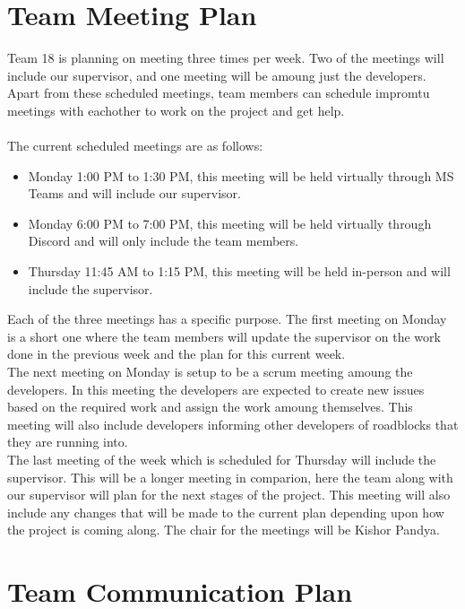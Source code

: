 \documentclass{article}
\begin{document}
\section{Team Meeting Plan}

Team 18 is planning on meeting three times per week. 
Two of the meetings will include our supervisor, and one meeting will be amoung just the developers. 
Apart from these scheduled meetings, team members can schedule impromtu meetings with eachother to work on the project and get help.\\ \\
The current scheduled meetings are as follows:
\begin{itemize}
  \item Monday 1:00 PM to 1:30 PM, this meeting will be held virtually through MS Teams and will include our supervisor.
  \item Monday 6:00 PM to 7:00 PM, this meeting will be held virtually through Discord and will only include the team members.
  \item Thursday 11:45 AM to 1:15 PM, this meeting will be held in-person and will include the supervisor.
\end{itemize}

Each of the three meetings has a specific purpose. The first meeting on Monday is a short one where the team members will update the supervisor on the work done in the previous week and the plan for this current week. \\

The next meeting on Monday is setup to be a scrum meeting amoung the developers. In this meeting the developers are expected to create new issues based on the required work and assign the work amoung themselves. This meeting will also include developers informing other developers of roadblocks that they are running into. \\

The last meeting of the week which is scheduled for Thursday will include the supervisor. This will be a longer meeting in comparion, here the team along with our supervisor will plan for the next stages of the project. This meeting will also include any changes that will be made to the current plan depending upon how the project is coming along. The chair for the meetings will be Kishor Pandya.
\section{Team Communication Plan}
\end{document}
